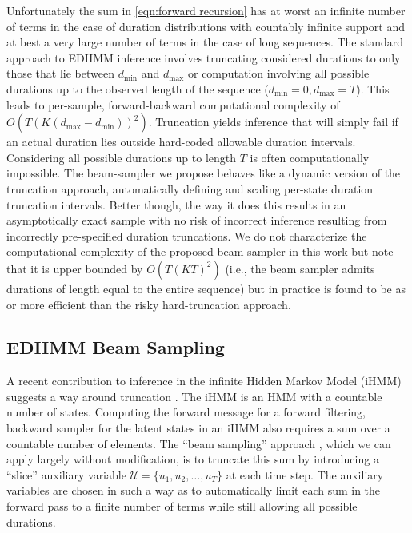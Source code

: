 Unfortunately the sum in \eqref{eqn:forward recursion} has at worst an infinite number of terms in the case of  duration distributions with countably infinite support and at best a very large number of terms in the case of long sequences. The standard approach to EDHMM inference involves truncating considered durations to only those that lie between $d_\mathrm{min}$ and $d_\mathrm{max}$ or computation involving all possible durations up to the observed length of the sequence ($d_\mathrm{min}=0, d_\mathrm{max}=T$). This leads to per-sample, forward-backward computational complexity of $O(T(K(d_\mathrm{max}-d_\mathrm{min}))^2)$.
Truncation yields inference that will simply fail if an actual duration lies outside hard-coded allowable duration intervals.   Considering all possible durations up to length $T$ is often computationally impossible.
The beam-sampler we propose behaves like a dynamic version of the truncation approach, automatically defining and scaling per-state duration truncation intervals.   Better though, the way it does this results in an asymptotically exact sample with no risk of incorrect inference resulting from incorrectly pre-specified duration truncations.   We do not characterize the computational complexity of the proposed beam sampler in this work but note that it is upper bounded by $O(T(KT)^2)$ (i.e., the beam sampler admits durations of length equal to the entire sequence) but in practice is found to be as  or more efficient than the risky hard-truncation approach.


\subsection{EDHMM Beam Sampling}

A recent contribution to inference 
in 
the infinite Hidden Markov Model (iHMM) \cite{Beal2002} suggests a way around truncation \cite{vanGael2008}.  The iHMM is an HMM with a countable number of states.  Computing the forward message for a forward filtering, backward sampler for the latent states in an iHMM also requires a sum over a countable number of elements.  
The ``beam sampling'' approach  \cite{vanGael2008}, which we can apply largely without modification, is to truncate this sum by introducing a ``slice'' \cite{Neal2003} auxiliary variable $\mathcal{U} = \{u_1, u_2, \ldots,u_T\}$ at each time step.  The auxiliary variables are chosen in such a way as to automatically limit each sum in the forward pass to a finite number of terms while still allowing all possible durations.%

